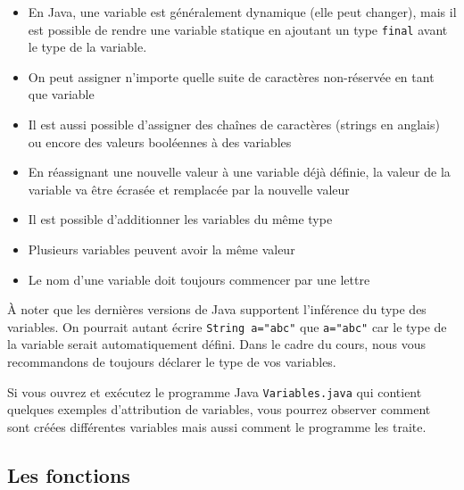 \begin{conseil}
\begin{itemize}
	\item En Java, une variable est généralement dynamique (elle peut changer), mais il est possible de rendre une variable statique en ajoutant un type \lstinline{final} avant le type de la variable.
	\item On peut assigner n'importe quelle suite de caractères non-réservée en tant que variable
	\item Il est aussi possible d'assigner des chaînes de caractères (strings en anglais) ou encore des valeurs booléennes à des variables
	\item En réassignant une nouvelle valeur à une variable déjà définie, la valeur de la variable va être écrasée et remplacée par la nouvelle valeur
	\item Il est possible d'additionner les variables du même type
	\item Plusieurs variables peuvent avoir la même valeur
	\item Le nom d'une variable doit toujours commencer par une lettre
\end{itemize}

\end{conseil}
À noter que les dernières versions de Java supportent l'inférence du type des variables. On pourrait autant écrire \lstinline{String a="abc"} que \lstinline{a="abc"} car le type de la variable serait automatiquement défini. 
Dans le cadre du cours, nous vous recommandons de toujours déclarer le type de vos variables.

Si vous ouvrez et exécutez le programme Java \lstinline{Variables.java} qui contient quelques exemples d'attribution de variables, vous pourrez observer comment sont créées différentes variables mais aussi comment le programme les traite.

\subsection{Les fonctions}

